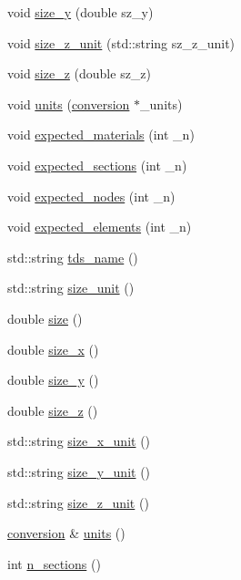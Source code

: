 \begin{DoxyCompactItemize}
\item 
void \hyperlink{classtds_a6213f1a947af9cf29d9d5d3865c02e8a}{size\+\_\+y} (double sz\+\_\+y)
\item 
void \hyperlink{classtds_a7a186b50510083c08285e467639db473}{size\+\_\+z\+\_\+unit} (std\+::string sz\+\_\+z\+\_\+unit)
\item 
void \hyperlink{classtds_a5df14e86f3b2ff4274dece7a42ed180b}{size\+\_\+z} (double sz\+\_\+z)
\item 
void \hyperlink{classtds_a409373885148ce6ee4205bf70f50d1e0}{units} (\hyperlink{classconversion}{conversion} $\ast$\+\_\+units)
\item 
void \hyperlink{classtds_a3e14535665f64a6767fe9f1895fcb46f}{expected\+\_\+materials} (int \+\_\+n)
\item 
void \hyperlink{classtds_a1648fa94e6b568f8a7fff734bef9c241}{expected\+\_\+sections} (int \+\_\+n)
\item 
void \hyperlink{classtds_a110a9b6d50811d675939c052570ac5a4}{expected\+\_\+nodes} (int \+\_\+n)
\item 
void \hyperlink{classtds_ab7533d7fdd94c188829812b470901e8b}{expected\+\_\+elements} (int \+\_\+n)
\item 
std\+::string \hyperlink{classtds_ad22bbd85e2113e86a31748b8a3416f48}{tds\+\_\+name} ()
\item 
std\+::string \hyperlink{classtds_ad1ddd92c4310315e98f811dd60efb7ac}{size\+\_\+unit} ()
\item 
double \hyperlink{classtds_a4c2d47950b0d7ee330c0c855aa6e52bd}{size} ()
\item 
double \hyperlink{classtds_a71a52f8dd2a39013853d60da85d5ba24}{size\+\_\+x} ()
\item 
double \hyperlink{classtds_a2ff73e167e7eed3a980213fb81b40ef8}{size\+\_\+y} ()
\item 
double \hyperlink{classtds_ad14edbd179004b670d371d8660b1b486}{size\+\_\+z} ()
\item 
std\+::string \hyperlink{classtds_a4f6d879a0cd31e65a760587945fd9009}{size\+\_\+x\+\_\+unit} ()
\item 
std\+::string \hyperlink{classtds_a0589d2ae127297bd3a81159b1e519212}{size\+\_\+y\+\_\+unit} ()
\item 
std\+::string \hyperlink{classtds_ac86b2ed48f3ac409ab1c760b1004a272}{size\+\_\+z\+\_\+unit} ()
\item 
\hyperlink{classconversion}{conversion} \& \hyperlink{classtds_ac3fb5f95974b18aba2d52c36d947c9f7}{units} ()
\item 
int \hyperlink{classtds_a073ce9850518f54ea9a5f2fad1f70d36}{n\+\_\+sections} ()

\end{DoxyCompactItemize}
